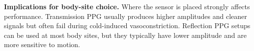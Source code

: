 \textbf{Implications for body-site choice.}  
Where the sensor is placed strongly affects performance. Transmission PPG usually produces higher amplitudes and cleaner signals but often fail during cold-induced vasoconstriction. Reflection PPG setups can be used at most body sites, but they typically have lower amplitude and are more sensitive to motion.\cite{castaneda_review_2018,azudin_principles_2023,budidha_human_2014,venema_robustness_2014}
